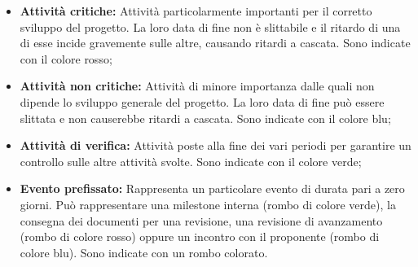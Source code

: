 \begin{itemize}
    \item \textbf{Attività critiche:} Attività particolarmente importanti per il corretto sviluppo del progetto. La loro data di fine non è slittabile e il ritardo di una di esse
    incide gravemente sulle altre, causando ritardi a cascata. Sono indicate con il colore rosso;
    \item \textbf{Attività non critiche:} Attività di minore importanza dalle quali non dipende lo sviluppo generale del progetto. La loro data di fine può essere slittata e non causerebbe ritardi a cascata.
    Sono indicate con il colore blu;
    \item \textbf{Attività di verifica:} Attività poste alla fine dei vari periodi per garantire un controllo sulle altre attività svolte.
    Sono indicate con il colore verde;
    \item \textbf{Evento prefissato:} Rappresenta un particolare evento di durata pari a zero giorni. Può rappresentare una milestone interna (rombo di colore verde), la consegna dei documenti
    per una revisione, una revisione di avanzamento (rombo di colore rosso) oppure un incontro con il
    proponente (rombo di colore blu). Sono indicate con un rombo colorato.
  \end{itemize}

